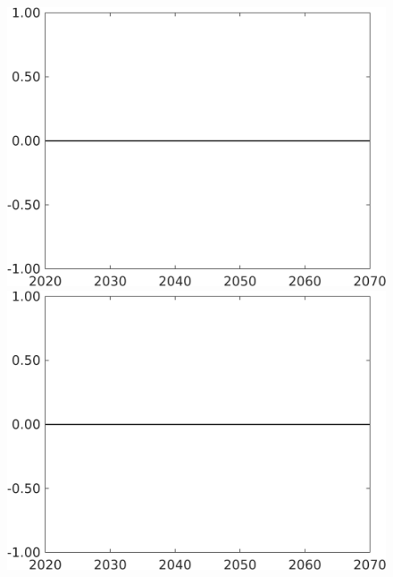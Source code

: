 \documentclass[12pt]{article}
\begin{document}
\begin{figure}[h!!]
\begin{minipage}[]{0.32\textwidth}
	\end{minipage}		
	\begin{minipage}[]{0.32\textwidth}
		\includegraphics[width=1\textwidth]{../../codding_model/own_basedOnFried/optimalPol_010922_revision/figures/all_13Sept22/CompTaufPER_bytaul_Reg0_gAg_spillover0_nsk0_xgr1_knspil0_sep0_LFlimit1_emsbase0_countec0_GovRev0_etaa0.79_lgd0.png}
	\end{minipage}
	\begin{minipage}[]{0.32\textwidth}
		\includegraphics[width=1\textwidth]{../../codding_model/own_basedOnFried/optimalPol_010922_revision/figures/all_13Sept22/CompTaufPER_bytaul_Reg0_gAn_spillover0_nsk0_xgr1_knspil0_sep0_LFlimit1_emsbase0_countec0_GovRev0_etaa0.79_lgd0.png}

\end{minipage}
\end{figure}
\end{document}
